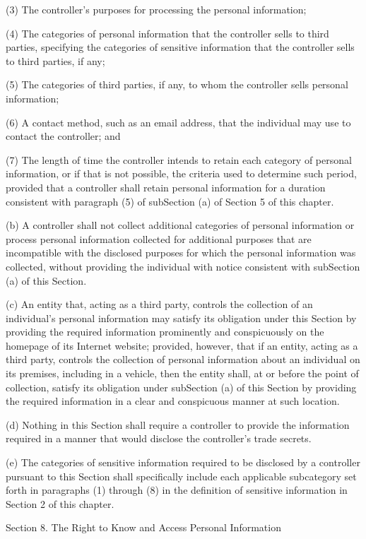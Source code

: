 (3) The controller’s purposes for processing the personal information;

(4) The categories of personal information that the controller sells to third parties, specifying the categories of sensitive information that the controller sells to third parties, if any; 

(5) The categories of third parties, if any, to whom the controller sells personal information;

(6) A contact method, such as an email address, that the individual may use to contact the controller; and

(7) The length of time the controller intends to retain each category of personal information, or if that is not possible, the criteria used to determine such period, provided that a controller shall retain personal information for a duration consistent with paragraph (5) of subSection (a) of Section 5 of this chapter.

(b) A controller shall not collect additional categories of personal information or process personal information collected for additional purposes that are incompatible with the disclosed purposes for which the personal information was collected, without providing the individual with notice consistent with subSection (a) of this Section. 

(c) An entity that, acting as a third party, controls the collection of an individual’s personal information may satisfy its obligation under this Section by providing the required information prominently and conspicuously on the homepage of its Internet website; provided, however, that if an entity, acting as a third party, controls the collection of personal information about an individual on its premises, including in a vehicle, then the entity shall, at or before the point of collection, satisfy its obligation under subSection (a) of this Section by providing the required information in a clear and conspicuous manner at such location.

(d) Nothing in this Section shall require a controller to provide the information required in a manner that would disclose the controller’s trade secrets.

(e) The categories of sensitive information required to be disclosed by a controller pursuant to this Section shall specifically include each applicable subcategory set forth in paragraphs (1) through (8) in the definition of sensitive information in Section 2 of this chapter.

Section 8. The Right to Know and Access Personal Information  

